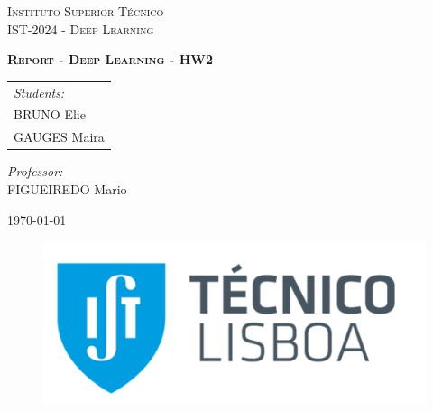 \begin{titlepage}
   \begin{center}
        \vspace*{1cm}

        \LARGE
        \textsc{Instituto Superior Técnico \\
                 IST-2024 - Deep Learning\\}

        \vspace{2.5cm}
        \huge
        \textbf{\textsc{Report - Deep Learning - HW2}}
    \end{center}
        
    \Large
    \vspace{2.5cm}
    \begin{tabular}{l}
        \emph{Students:}\\
        BRUNO Elie\\
        GAUGES Maira \\
    \end{tabular}

    \begin{flushright}
        \Large
        \vspace{2.5cm}
        \emph{Professor:} \\
        FIGUEIREDO Mario
    \end{flushright}
        
    \begin{center}
        \Large
        \vspace{2.5cm}
        \today
        
        \vfill
        \large

        \begin{figure}[!b]
            \centering
            \includegraphics[scale=0.275]{./images/logo.png}
        \end{figure}
   \end{center}
\end{titlepage}